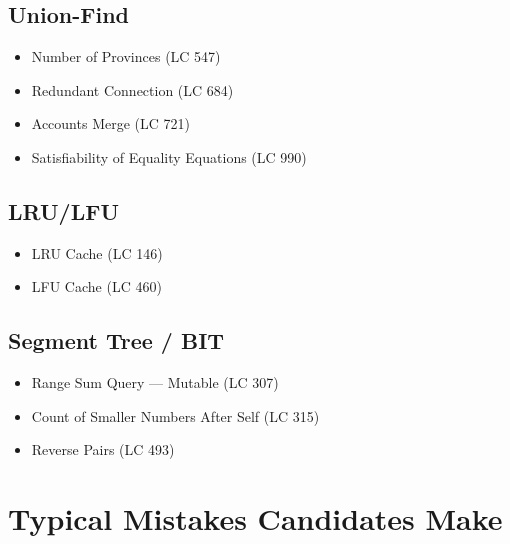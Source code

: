 \documentclass[11pt]{article}
\providecommand{\tightlist}{\setlength{\itemsep}{1pt}\setlength{\parskip}{0pt}}
\begin{document}
\subsection{Union-Find}\label{union-find}

\begin{itemize}
\tightlist
\item
  Number of Provinces (LC 547)
\item
  Redundant Connection (LC 684)
\item
  Accounts Merge (LC 721)
\item
  Satisfiability of Equality Equations (LC 990)
\end{itemize}

\subsection{LRU/LFU}\label{lrulfu}

\begin{itemize}
\tightlist
\item
  LRU Cache (LC 146)
\item
  LFU Cache (LC 460)
\end{itemize}

\subsection{Segment Tree / BIT}\label{segment-tree--bit}

\begin{itemize}
\tightlist
\item
  Range Sum Query --- Mutable (LC 307)
\item
  Count of Smaller Numbers After Self (LC 315)
\item
  Reverse Pairs (LC 493)
\end{itemize}

\section{Typical Mistakes Candidates Make}\label{typical-mistakes-candidates-make}
\end{document}
